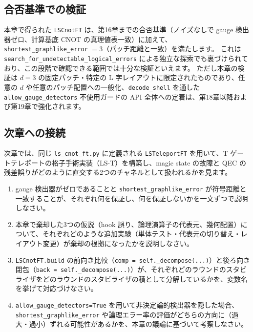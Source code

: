 \subsection*{合否基準での検証}
本章で得られた \texttt{LSCnotFT} は、第16章までの合否基準（ノイズなしで gauge 検出器ゼロ、計算基底 CNOT の真理値表一致）に加えて、\texttt{shortest\_graphlike\_error} $=3$（パッチ距離と一致）を満たします。
これは \texttt{search\_for\_undetectable\_logical\_errors} による独立な探索でも裏づけられており、この段階で確認できる範囲では十分な検証といえます。
ただし本章の検証は $d=3$ の固定パッチ・特定の L 字レイアウトに限定されたものであり、任意の $d$ や任意のパッチ配置への一般化、\texttt{decode\_shell} を通した \texttt{allow\_gauge\_detectors} 不使用ガードの API 全体への定着は、第18章以降および第19章で強化されます。

\subsection*{次章への接続}
次章では、同じ \texttt{ls\_cnot\_ft.py} に定義される \texttt{LSTeleportFT} を用いて、T ゲートテレポートの格子手術実装（LS-T）を構築し、magic state の故障と QEC の残差誤りがどのように直交する2つのチャネルとして扱われるかを見ます。

\begin{exercise}
  \begin{enumerate}
    \item gauge 検出器がゼロであることと \texttt{shortest\_graphlike\_error} が符号距離と一致することが、それぞれ何を保証し、何を保証しないかを一文ずつで説明しなさい。
    \item 本章で棄却した3つの仮説（hook 誤り、論理演算子の代表元、幾何配置）について、それぞれどのような追加実験（単体テスト・代表元の切り替え・レイアウト変更）が棄却の根拠になったかを説明しなさい。
    \item \texttt{LSCnotFT.build} の前向き比較（\texttt{comp = self.\_decompose(...)}）と後ろ向き閉包（\texttt{back = self.\_decompose(...)}）が、それぞれどのラウンドのスタビライザをどのラウンドのスタビライザの積として分解しているかを、変数名を挙げて対応づけなさい。
    \item \texttt{allow\_gauge\_detectors=True} を用いて非決定論的検出器を隠した場合、\texttt{shortest\_graphlike\_error} や論理エラー率の評価がどちらの方向に（過大・過小）ずれる可能性があるかを、本章の議論に基づいて考察しなさい。
  \end{enumerate}
\end{exercise}
